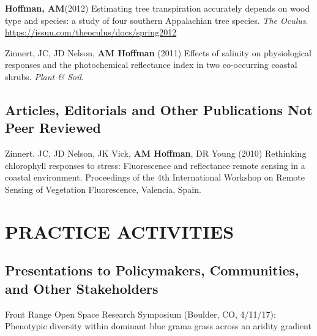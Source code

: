 \documentclass{cv}
\begin{document}
\begin{pubenum}
\sloppy %
\item\textbf{Hoffman, AM}\footnotemark[1] (2012) Estimating tree transpiration accurately depends on wood type and species: a study of four southern Appalachian tree species. \textit{The Oculus}. \href{https://issuu.com/theoculus/docs/spring2012}{https://issuu.com/theoculus/docs/spring2012}

\item Zinnert, JC, JD Nelson, \textbf{AM Hoffman} (2011) Effects of salinity on physiological responses and the photochemical reflectance index in two co-occurring coastal shrubs. \textit{Plant \& Soil}. 

\end{pubenum}

\subsection*{Articles, Editorials and Other Publications Not Peer Reviewed}

Zinnert, JC, JD Nelson, JK Vick, \textbf{AM Hoffman}, DR Young (2010) Rethinking chlorophyll responses to stress: Fluorescence and reflectance remote sensing in a coastal environment. Proceedings of the 4th International Workshop on Remote Sensing of Vegetation Fluorescence, Valencia, Spain.


\section*{PRACTICE ACTIVITIES}

\subsection*{Presentations to Policymakers, Communities, and Other Stakeholders}

Front Range Open Space Research Symposium (Boulder, CO, 4/11/17): Phenotypic diversity within dominant blue grama grass across an aridity gradient

\end{document}
